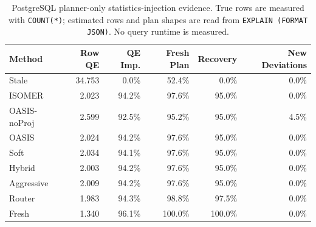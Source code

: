 \begin{table}[t]
  \centering
  \small
  \caption{PostgreSQL planner-only statistics-injection evidence. True rows are measured with \texttt{COUNT(*)}; estimated rows and plan shapes are read from \texttt{EXPLAIN (FORMAT JSON)}. No query runtime is measured.}
  \label{tab:postgres_planner_stats_injection}
  \setlength{\tabcolsep}{4pt}
  \begin{tabular}{lrrrrr}
    \toprule
    Method & Row QE & QE Imp. & Fresh Plan & Recovery & New Deviations \\
    \midrule
    Stale & 34.753 & 0.0\% & 52.4\% & 0.0\% & 0.0\% \\
    ISOMER & 2.023 & 94.2\% & 97.6\% & 95.0\% & 0.0\% \\
    OASIS-noProj & 2.599 & 92.5\% & 95.2\% & 95.0\% & 4.5\% \\
    OASIS & 2.024 & 94.2\% & 97.6\% & 95.0\% & 0.0\% \\
    Soft & 2.034 & 94.1\% & 97.6\% & 95.0\% & 0.0\% \\
    Hybrid & 2.003 & 94.2\% & 97.6\% & 95.0\% & 0.0\% \\
    Aggressive & 2.009 & 94.2\% & 97.6\% & 95.0\% & 0.0\% \\
    Router & 1.983 & 94.3\% & 98.8\% & 97.5\% & 0.0\% \\
    Fresh & 1.340 & 96.1\% & 100.0\% & 100.0\% & 0.0\% \\
    \bottomrule
  \end{tabular}
\end{table}

